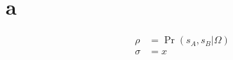 \documentclass{article}
\begin{document}
\appendix\section{a}
\begin{equation}\begin{aligned}
\rho &= \Pr(s_A,s_B | \Omega) \\
\sigma &= x
\end{aligned}\end{equation}
\end{document}
